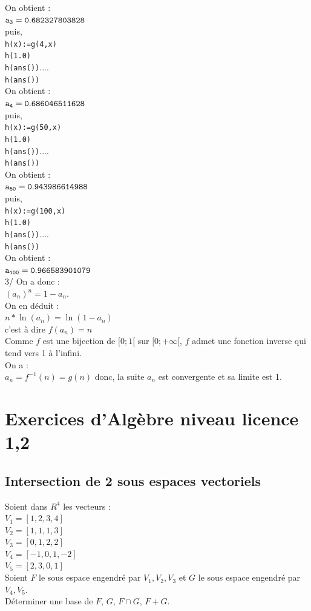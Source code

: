 \documentclass[a4paper,11pt]{book}
\begin{document}
On obtient :\\
${\tt a_3=0.682327803828}$\\
puis,\\
{\tt h(x):=g(4,x)}\\
{\tt h(1.0)}\\
{\tt h(ans())}....\\
{\tt h(ans())}\\
On obtient :\\
${\tt a_4=0.686046511628}$\\
puis,\\
{\tt h(x):=g(50,x)}\\
{\tt h(1.0)}\\
{\tt h(ans())}....\\
{\tt h(ans())}\\
On obtient :\\
${\tt a_{50}=0.943986614988}$\\
puis,\\
{\tt h(x):=g(100,x)}\\
{\tt h(1.0)}\\
{\tt h(ans())}....\\
{\tt h(ans())}\\
On obtient :\\
${\tt a_{100}=0.966583901079}$\\
3/ On a donc :\\
$(a_n)^n=1-a_n$.\\
On en d\'eduit :\\
$n*\ln(a_n)=\ln(1-a_n)$\\
c'est \`a dire $f(a_n)=n$\\
Comme $f$ est une bijection de $[0;1[$ sur $[0;+\infty[$, $f$ admet une 
fonction inverse qui tend vers 1 \`a l'infini.\\
On a :\\
$a_n=f^{-1}(n)=g(n)$ donc, la suite $a_n$ est convergente et sa limite est 1.

\chapter{Exercices d'Alg\`ebre niveau licence 1,2}
\section{Intersection de 2 sous espaces vectoriels}
Soient dans $R^4$ les vecteurs :\\
$V_1=[1,2,3,4]$\\
$V_2=[1,1,1,3]$\\
$V_3=[0,1,2,2]$\\
$V_4=[-1,0,1,-2]$\\
$V_5=[2,3,0,1]$\\
Soient $F$ le sous espace engendr\'e par $V_1,V_2,V_3$ et
$G$ le sous espace engendr\'e par $V_4,V_5$.\\
D\'eterminer une base de $F$, $G$, $F \cap G$, $F+G$.
\end{document}
